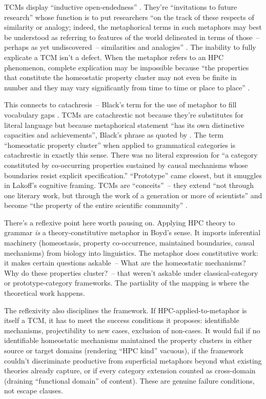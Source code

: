\documentclass[12pt]{article}
\begin{document}
TCMs display \enquote{inductive open-endedness} \citep[363--364]{boyd1979}. They're \enquote{invitations to future research} whose function is to put researchers \enquote{on the track of these respects of similarity or analogy; indeed, the metaphorical terms in such metaphors may best be understood as referring to features of the world delineated in terms of those~-- perhaps as yet undiscovered~-- similarities and analogies} \citep[489]{boyd1993metaphor}. The inability to fully explicate a TCM isn't a defect. When the metaphor refers to an HPC phenomenon, complete explication may be impossible because \enquote{the properties that constitute the homeostatic property cluster may not even be finite in number and they may vary significantly from time to time or place to place} \citep[529]{boyd1993metaphor}.

This connects to catachresis~-- Black's term for the use of metaphor to fill vocabulary gaps \citep[356--357]{boyd1979}. TCMs are catachrestic not because they're substitutes for literal language but
because metaphorical statement \enquote{has its own distinctive capacities and
achievements}, Black's phrase as quoted by \textcite[482]{boyd1993metaphor}. The term \enquote{homeostatic property cluster} when applied to grammatical categories is catachrestic in exactly this sense. There was no literal expression for \enquote{a category constituted by co-occurring properties sustained by causal mechanisms whose boundaries resist explicit specification.} \enquote{Prototype} came closest, but it smuggles in Lakoff's cognitive framing. TCMs are \enquote{conceits}~-- they extend \enquote{not through one literary work, but through the work of a generation or more of scientists} and become \enquote{the property of the entire scientific community} \citep[361]{boyd1979}.

There's a reflexive point here worth pausing on. Applying HPC theory to grammar \emph{is} a theory-constitutive metaphor in Boyd's sense. It imports inferential machinery (homeostasis, property co-occurrence, maintained boundaries, causal mechanisms) from biology into linguistics. The metaphor does constitutive work: it makes certain questions askable~-- What are the homeostatic mechanisms? Why do these properties cluster?~-- that weren't askable under classical-category or prototype-category frameworks. The partiality of the mapping is where the theoretical work happens.

The reflexivity also disciplines the framework. If HPC-applied-to-metaphor is itself a TCM, it has to meet the success conditions it proposes: identifiable mechanisms, projectibility to new cases, exclusion of non-cases. It would fail if no identifiable homeostatic mechanisms maintained the property clusters in either source or target domains (rendering \enquote{HPC kind} vacuous), if the framework couldn't discriminate productive from superficial metaphors beyond what existing theories already capture, or if every category extension counted as cross-domain (draining \enquote{functional domain} of content). These are genuine failure conditions, not escape clauses.
\end{document}

